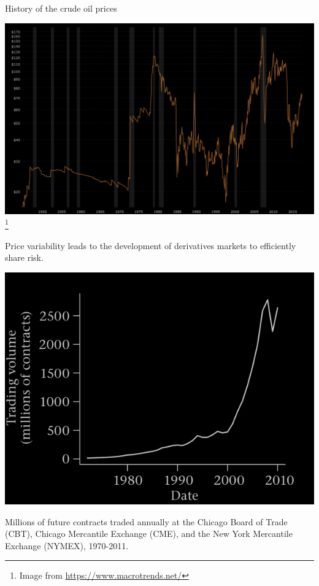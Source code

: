 \begin{frame}[fragile,t]
	\begin{center}
	History of the crude oil prices  \bigskip \bigskip

	\includegraphics[scale=0.25]{figs/crude-oil-price-history-chart-neg.png}\footnote{Image from
	\url{https://www.macrotrends.net/}}
	\bigskip

	\end{center}
\end{frame}
\begin{frame}[fragile,t]

\begin{center}
 Price variability leads to the development of derivatives markets to efficiently share risk.
 \bigskip \bigskip

 \includegraphics[scale=0.3]{figs/Figure1-1-d.png}
 \bigskip

 Millions of future contracts traded annually at the Chicago Board of Trade (CBT), Chicago
 Mercantile Exchange (CME), and the New York Mercantile Exchange (NYMEX), 1970-2011.
\end{center}
\end{frame}
